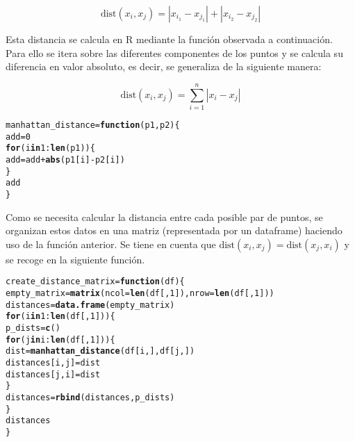 \documentclass[12pt]{report}\usepackage[]{graphicx}\usepackage[dvipsnames]{xcolor}
\makeatletter
\newcommand{\hlnum}[1]{\textcolor[rgb]{0.686,0.059,0.569}{#1}}%
\newcommand{\hlopt}[1]{\textcolor[rgb]{0,0,0}{#1}}%
\newcommand{\hlstd}[1]{\textcolor[rgb]{0.345,0.345,0.345}{#1}}%
\newcommand{\hlkwa}[1]{\textcolor[rgb]{0.161,0.373,0.58}{\textbf{#1}}}%
\newcommand{\hlkwb}[1]{\textcolor[rgb]{0.69,0.353,0.396}{#1}}%
\newcommand{\hlkwc}[1]{\textcolor[rgb]{0.333,0.667,0.333}{#1}}%
\newcommand{\hlkwd}[1]{\textcolor[rgb]{0.737,0.353,0.396}{\textbf{#1}}}%
\newenvironment{kframe}{%
 \def\at@end@of@kframe{}%
 \ifinner\ifhmode%
  \def\at@end@of@kframe{\end{minipage}}%
  \begin{minipage}{\columnwidth}%
 \fi\fi%
 \def\FrameCommand##1{\hskip\@totalleftmargin \hskip-\fboxsep
 \colorbox{shadecolor}{##1}\hskip-\fboxsep
     \hskip-\linewidth \hskip-\@totalleftmargin \hskip\columnwidth}%
 \MakeFramed {\advance\hsize-\width
   \@totalleftmargin\z@ \linewidth\hsize
   \@setminipage}}%
 {\par\unskip\endMakeFramed%
 \at@end@of@kframe}
\newenvironment{knitrout}{}{} %
\newcommand{\dt}{\text{dist}}
\makeatother
\begin{document}
					$$
					\dt(x_i, x_j) = |x_{i_1}-x_{j_1}| + |x_{i_2}-x_{j_2}|
					$$
					
					Esta distancia se calcula en R mediante la función observada a continuación. Para ello se itera sobre las diferentes componentes de los puntos y se calcula su diferencia en valor absoluto, es decir, se generaliza de la siguiente manera: 
					
					$$
					\dt(x_i, x_j) = \sum_{i=1}^n |x_i-x_j|
					$$
					
\begin{knitrout}
\color{fgcolor}\begin{kframe}
\begin{alltt}
\hlstd{manhattan_distance} \hlkwb{=} \hlkwa{function}\hlstd{(}\hlkwc{p1}\hlstd{,} \hlkwc{p2}\hlstd{) \{}
        \hlstd{add} \hlkwb{=} \hlnum{0}
        \hlkwa{for}\hlstd{(i} \hlkwa{in} \hlnum{1}\hlopt{:}\hlkwd{len}\hlstd{(p1))\{}
                \hlstd{add} \hlkwb{=} \hlstd{add} \hlopt{+} \hlkwd{abs}\hlstd{(p1[i]} \hlopt{-} \hlstd{p2[i])}
        \hlstd{\}}
        \hlstd{add}
\hlstd{\}}
\end{alltt}
\end{kframe}
\end{knitrout}
					
					Como se necesita calcular la distancia entre cada posible par de puntos, se organizan estos datos en una matriz (representada por un dataframe) haciendo uso de la función anterior. Se tiene en cuenta que $\dt(x_i, x_j) = \dt(x_j, x_i)$ y se recoge en la siguiente función. 
					
\begin{knitrout}
\color{fgcolor}\begin{kframe}
\begin{alltt}
\hlstd{create_distance_matrix} \hlkwb{=} \hlkwa{function}\hlstd{(}\hlkwc{df}\hlstd{)\{}
        \hlstd{empty_matrix} \hlkwb{=} \hlkwd{matrix}\hlstd{(}\hlkwc{ncol} \hlstd{=} \hlkwd{len}\hlstd{(df[,}\hlnum{1}\hlstd{]),} \hlkwc{nrow} \hlstd{=} \hlkwd{len}\hlstd{(df[,}\hlnum{1}\hlstd{]))}
        \hlstd{distances} \hlkwb{=} \hlkwd{data.frame}\hlstd{(empty_matrix)}
        \hlkwa{for} \hlstd{(i} \hlkwa{in} \hlnum{1}\hlopt{:}\hlkwd{len}\hlstd{(df[,}\hlnum{1}\hlstd{]))\{}
                \hlstd{p_dists} \hlkwb{=} \hlkwd{c}\hlstd{()}
                \hlkwa{for} \hlstd{(j} \hlkwa{in} \hlstd{i}\hlopt{:}\hlkwd{len}\hlstd{(df[,}\hlnum{1}\hlstd{]))\{}
                        \hlstd{dist} \hlkwb{=} \hlkwd{manhattan_distance}\hlstd{(df[i,], df[j,])}
                        \hlstd{distances[i,j]} \hlkwb{=} \hlstd{dist}
                        \hlstd{distances[j,i]} \hlkwb{=} \hlstd{dist}
                \hlstd{\}}
                \hlstd{distances} \hlkwb{=} \hlkwd{rbind}\hlstd{(distances, p_dists)}
        \hlstd{\}}
        \hlstd{distances}
\hlstd{\}}
\end{alltt}
\end{kframe}
\end{knitrout}
					
\end{document}
